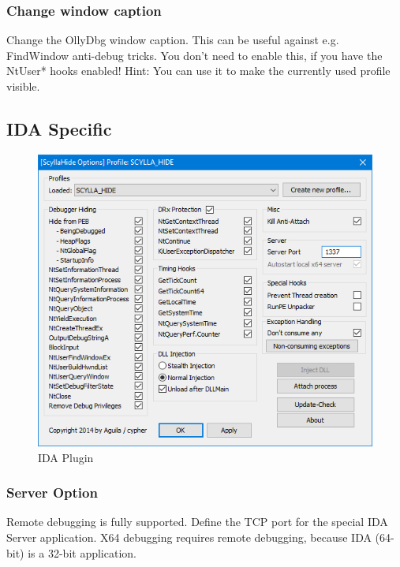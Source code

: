 \documentclass[10pt,a4paper]{article}
\begin{document}
\subsubsection{Change window caption}
Change the OllyDbg window caption. This can be useful against e.g. FindWindow anti-debug tricks. You don't need to enable this, if you have the NtUser* hooks enabled! Hint: You can use it to make the currently used profile visible.

\subsection{IDA Specific}

\begin{figure}[H]
\centering
\includegraphics[scale=1]{idaplugin.PNG}
\caption{IDA Plugin}
\end{figure}

\subsubsection{Server Option}
Remote debugging is fully supported. Define the TCP port for the special IDA Server application. X64 debugging requires remote debugging, because IDA (64-bit) is a 32-bit application.

\end{document}
